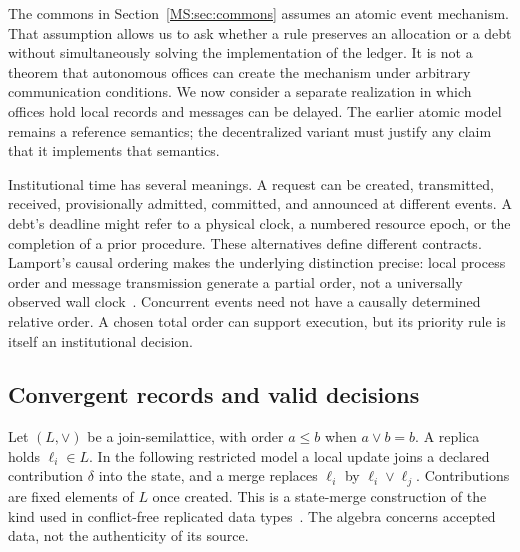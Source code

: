 The commons in Section~\ref{MS:sec:commons} assumes an atomic event mechanism. That assumption allows us to ask whether a rule preserves an allocation or a debt without simultaneously solving the implementation of the ledger. It is not a theorem that autonomous offices can create the mechanism under arbitrary communication conditions. We now consider a separate realization in which offices hold local records and messages can be delayed. The earlier atomic model remains a reference semantics; the decentralized variant must justify any claim that it implements that semantics.

Institutional time has several meanings. A request can be created, transmitted, received, provisionally admitted, committed, and announced at different events. A debt's deadline might refer to a physical clock, a numbered resource epoch, or the completion of a prior procedure. These alternatives define different contracts. Lamport's causal ordering makes the underlying distinction precise: local process order and message transmission generate a partial order, not a universally observed wall clock~\cite{MS:lamporttime}. Concurrent events need not have a causally determined relative order. A chosen total order can support execution, but its priority rule is itself an institutional decision.

\subsection{Convergent records and valid decisions}
Let $(L,\vee)$ be a join-semilattice, with order $a\leq b$ when $a\vee b=b$. A replica holds $\ell_i\in L$. In the following restricted model a local update joins a declared contribution $\delta$ into the state, and a merge replaces $\ell_i$ by $\ell_i\vee\ell_j$. Contributions are fixed elements of $L$ once created. This is a state-merge construction of the kind used in conflict-free replicated data types~\cite{MS:preguicacrdt}. The algebra concerns accepted data, not the authenticity of its source.

